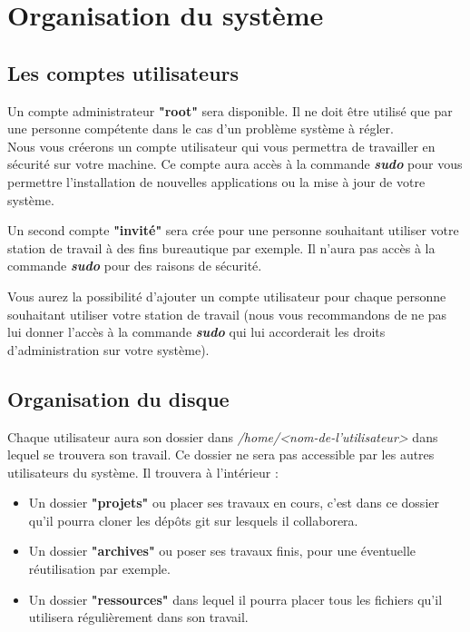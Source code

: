 \section{Organisation du système}

\subsection{Les comptes utilisateurs}

Un compte administrateur \textbf{"root"} sera disponible. Il ne doit être utilisé que par une personne compétente dans le cas d'un problème système à régler.\\

Nous vous créerons un compte utilisateur qui vous permettra de travailler en sécurité sur votre machine. Ce compte aura accès à la commande \textit{\textbf{sudo}} pour vous permettre l'installation de nouvelles applications ou la mise à jour de votre système.

Un second compte \textbf{"invité"} sera crée pour une personne souhaitant utiliser votre station de travail à des fins bureautique par exemple. Il n'aura pas accès à la commande \textit{\textbf{sudo}} pour des raisons de sécurité.

Vous aurez la possibilité d'ajouter un compte utilisateur pour chaque personne souhaitant utiliser votre station de travail (nous vous recommandons de ne pas lui donner l'accès à la commande \textit{\textbf{sudo}} qui lui accorderait les droits d'administration sur votre système).

\subsection{Organisation du disque}

Chaque utilisateur aura son dossier dans \textit{/home/<nom-de-l'utilisateur>} dans lequel se trouvera son travail. Ce dossier ne sera pas accessible par les autres utilisateurs du système. Il trouvera à l'intérieur :
\begin{itemize}
	\item Un dossier \textbf{"projets"} ou placer ses travaux en cours, c'est dans ce dossier qu'il pourra cloner les dépôts git sur lesquels il collaborera.
	\item Un dossier \textbf{"archives"} ou poser ses travaux finis, pour une éventuelle réutilisation par exemple.
	\item Un dossier \textbf{"ressources"} dans lequel il pourra placer tous les fichiers qu'il utilisera régulièrement dans son travail.
\end{itemize}

